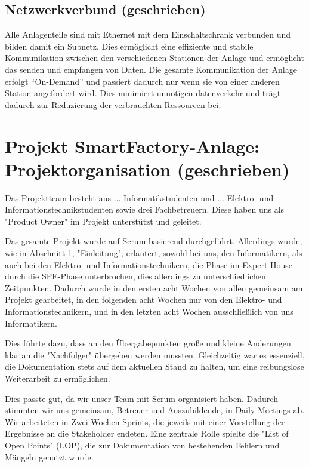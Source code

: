\subsection{Netzwerkverbund (geschrieben)}\label{sec:Netzwerkverbund}

Alle Anlagenteile sind mit Ethernet mit dem Einschaltschrank verbunden und bilden damit ein Subnetz. Dies ermöglicht eine 
effiziente und stabile Kommunikation zwischen den verschiedenen Stationen der Anlage und ermöglicht das senden und empfangen 
von Daten.
Die gesamte Kommunikation der Anlage erfolgt “On-Demand” und passiert dadurch nur wenn sie von einer anderen Station 
angefordert wird. Dies minimiert unnötigen datenverkehr und trägt dadurch zur Reduzierung der verbrauchten Ressourcen bei.

\section{Projekt SmartFactory-Anlage: Projektorganisation (geschrieben)}\label{sec:Projekt SmartFactory-Anlage: Projektorganisation (am ändern)}

Das Projektteam besteht aus ... Informatikstudenten und ... Elektro- und Informationstechnikstudenten sowie drei 
Fachbetreuern. Diese haben uns als "Product Owner" im Projekt unterstützt und geleitet.  

Das gesamte Projekt wurde auf Scrum basierend durchgeführt. Allerdings wurde, wie in Abschnitt 1, "Einleitung", erläutert, 
sowohl bei uns, den Informatikern, als auch bei den Elektro- und Informationstechnikern, die Phase im Expert House durch die 
SPE-Phase unterbrochen, dies allerdings zu unterschiedlichen Zeitpunkten. Dadurch wurde in den ersten acht Wochen von allen 
gemeinsam am Projekt gearbeitet, in den folgenden acht Wochen nur von den Elektro- und Informationstechnikern, und in den 
letzten acht Wochen ausschließlich von uns Informatikern.  

Dies führte dazu, dass an den Übergabepunkten große und kleine Änderungen klar an die "Nachfolger" übergeben werden mussten.
Gleichzeitig war es essenziell, die Dokumentation stets auf dem aktuellen Stand zu halten, um eine reibungslose Weiterarbeit 
zu ermöglichen.  

Dies passte gut, da wir unser Team mit Scrum organisiert haben. Dadurch stimmten wir uns gemeinsam, Betreuer und 
Auszubildende, in Daily-Meetings ab. Wir arbeiteten in Zwei-Wochen-Sprints, die jeweils mit einer Vorstellung der 
Ergebnisse an die Stakeholder endeten. Eine zentrale Rolle spielte die "List of Open Points" (LOP), die zur Dokumentation 
von bestehenden Fehlern und Mängeln genutzt wurde.  

